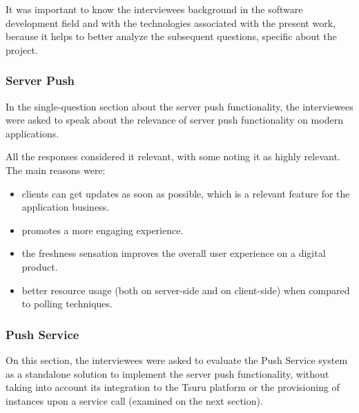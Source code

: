 It was important to know the interviewees background in the software development field and with the technologies associated with the present work, because it helps to better analyze the subsequent questions, specific about the project.


\subsubsection{Server Push}

In the single-question section about the server push functionality, the interviewees were asked to speak about the relevance of server push functionality on modern applications.

All the responses considered it relevant, with some noting it as highly relevant. The main reasons were:
\begin{itemize}
    \item clients can get updates as soon as possible, which is a relevant feature for the application business.
    \item promotes a more engaging experience.
    \item the freshness sensation improves the overall user experience on a digital product.
    \item better resource usage (both on server-side and on client-side) when compared to polling techniques.
\end{itemize}


\subsubsection{Push Service}

On this section, the interviewees were asked to evaluate the Push Service system as a standalone solution to implement the server push functionality, without taking into account its integration to the Tsuru platform or the provisioning of instances upon a service call (examined on the next section).

